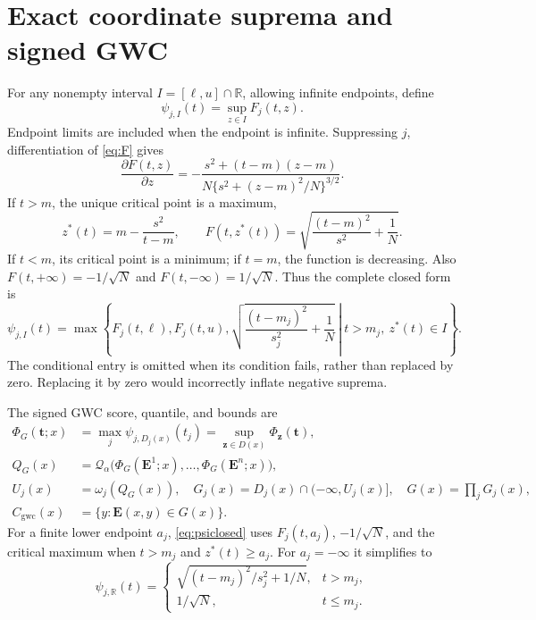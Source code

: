 \documentclass[11pt]{article}
\newcommand{\R}{\mathbb R}
\newcommand{\E}{\mathbf E}
\newcommand{\tvec}{\mathbf t}
\newcommand{\zvec}{\mathbf z}
\newcommand{\Q}{\mathcal Q_\alpha}
\newcommand{\Cgwc}{C_{\mathrm{gwc}}}
\begin{document}
\section{Exact coordinate suprema and signed GWC}
For any nonempty interval $I=[\ell,u]\cap\R$, allowing infinite endpoints,
define
\begin{equation}\label{eq:psi}
 \psi_{j,I}(t)=\sup_{z\in I}F_j(t,z).
\end{equation}
Endpoint limits are included when the endpoint is infinite. Suppressing $j$,
differentiation of \eqref{eq:F} gives
\begin{equation}\label{eq:derivative}
 \frac{\partial F(t,z)}{\partial z}
 =-\frac{s^2+(t-m)(z-m)}{N\{s^2+(z-m)^2/N\}^{3/2}}.
\end{equation}
If $t>m$, the unique critical point is a maximum,
\begin{equation}\label{eq:critical}
 z^*(t)=m-\frac{s^2}{t-m},\qquad
 F(t,z^*(t))=\sqrt{\frac{(t-m)^2}{s^2}+\frac1N}.
\end{equation}
If $t<m$, its critical point is a minimum; if $t=m$, the function is decreasing.
Also $F(t,+\infty)=-1/\sqrt N$ and $F(t,-\infty)=1/\sqrt N$.
Thus the complete closed form is
\begin{equation}\label{eq:psiclosed}
 \psi_{j,I}(t)=\max\left\{
 F_j(t,\ell),F_j(t,u),
 \left.\sqrt{\frac{(t-m_j)^2}{s_j^2}+\frac1N}
 \ \right|\ t>m_j,\ z^*(t)\in I\right\}.
\end{equation}
The conditional entry is omitted when its condition fails, rather than replaced
by zero. Replacing it by zero would incorrectly inflate negative suprema.

The signed GWC score, quantile, and bounds are
\begin{align}
 \Phi_G(\tvec;x)&=\max_j\psi_{j,D_j(x)}(t_j)
                =\sup_{\zvec\in D(x)}\Phi_{\zvec}(\tvec),\label{eq:gwcscore}\\
 Q_G(x)&=\Q\big(\Phi_G(\E^1;x),\ldots,\Phi_G(\E^n;x)\big),\label{eq:gwcq}\\
 U_j(x)&=\omega_j(Q_G(x)),\quad G_j(x)=D_j(x)\cap(-\infty,U_j(x)],
 \quad G(x)=\prod_jG_j(x),\label{eq:G}\\
 \Cgwc(x)&=\{y:\E(x,y)\in G(x)\}.\label{eq:Cgwc}
\end{align}
For a finite lower endpoint $a_j$, \eqref{eq:psiclosed} uses $F_j(t,a_j)$,
$-1/\sqrt N$, and the critical maximum when $t>m_j$ and $z^*(t)\ge a_j$.
For $a_j=-\infty$ it simplifies to
\[
 \psi_{j,\R}(t)=
 \begin{cases}
 \sqrt{(t-m_j)^2/s_j^2+1/N},&t>m_j,\\
 1/\sqrt N,&t\le m_j.
 \end{cases}
\]
\end{document}
